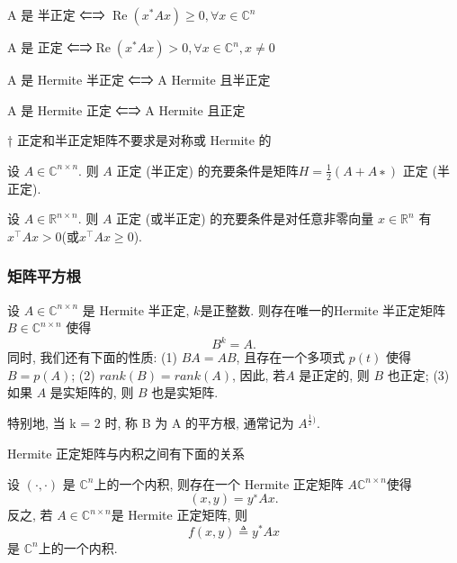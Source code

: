 \documentclass[12pt,a4paper]{article}
\begin{document}
A 是 半正定 ⇐⇒ $\operatorname{Re}\left(x^{*} A x\right) \geq 0, \forall x \in \mathbb{C}^{n}$

A 是 正定 ⇐⇒$\operatorname{Re}\left(x^{*} A x\right)>0, \forall x \in \mathbb{C}^{n}, x \neq 0$

A 是 Hermite 半正定 ⇐⇒ A Hermite 且半正定

A 是 Hermite 正定 ⇐⇒ A Hermite 且正定

\begin{framed}
	† 正定和半正定矩阵不要求是对称或 Hermite 的
\end{framed}

\begin{framed}
	\begin{theorem}
		设 $A ∈ \mathbb{C}^{n×n}$. 则 $A$ 正定 (半正定) 的充要条件是矩阵$ H =\frac{1}{2}(A +A∗)$ 正定 (半正定). 
	\end{theorem}
\end{framed}

\begin{framed}
	\begin{theorem}
		设 $A ∈ \mathbb{R}^{n×n}$. 则 $A$ 正定 (或半正定) 的充要条件是对任意非零向量 $x ∈ \mathbb{R}^n$ 有 $x^{⊺}Ax > 0 $(或$ x^{⊺}Ax ≥ 0$). 
	\end{theorem}
\end{framed}


\subsubsection{矩阵平方根}
\begin{framed}
	\begin{theorem}
	 设 $A ∈ \mathbb{C}^{n×n}$ 是 Hermite 半正定, $k $是正整数. 则存在唯一的Hermite 半正定矩阵 $B ∈ \mathbb{C}^{n×n}$ 使得
	 $$B^k = A.$$
	 同时, 我们还有下面的性质:
	 (1) $BA = AB$, 且存在一个多项式 $p(t)$ 使得$ B = p(A)$;
	 (2) $rank(B) = rank(A)$, 因此, 若$ A$ 是正定的, 则 $B$ 也正定;
	 (3) 如果 $A$ 是实矩阵的, 则 $B$ 也是实矩阵.
	\end{theorem}
\end{framed}

特别地, 当 k = 2 时, 称 B 为 A 的平方根, 通常记为 $A^{\frac{1}{2})}$.

Hermite 正定矩阵与内积之间有下面的关系
\begin{framed}
	\begin{theorem}
		设 $(·, ·)$ 是 $\mathbb{C}^n$上的一个内积, 则存在一个 Hermite 正定矩阵 $A  \mathbb{C}^{n×n}$使得
		$$(x, y) = y^∗Ax.$$
		反之, 若 $A ∈  \mathbb{C}^{n×n} $是 Hermite 正定矩阵, 则
		$$
		f(x, y) \triangleq y^{*} A x
		$$
		是 $\mathbb{C}^n $上的一个内积. 
	\end{theorem}
\end{framed}
\end{document}
